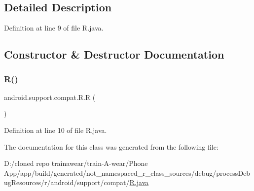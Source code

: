 \subsection{Detailed Description}


Definition at line 9 of file R.\+java.



\subsection{Constructor \& Destructor Documentation}
\mbox{\label{classandroid_1_1support_1_1compat_1_1_r_a5ccf4b4efeb034ade53739f6a3deee4d}} 
\subsubsection{\texorpdfstring{R()}{R()}}
{\footnotesize\ttfamily android.\+support.\+compat.\+R.\+R (\begin{DoxyParamCaption}{ }\end{DoxyParamCaption})\hspace{0.3cm}{\ttfamily [private]}}



Definition at line 10 of file R.\+java.


\begin{DoxyCode}{0}

\end{DoxyCode}


The documentation for this class was generated from the following file\+:\begin{DoxyCompactItemize}
\item 
D\+:/cloned repo trainawear/train-\/\+A-\/wear/\+Phone App/app/build/generated/not\+\_\+namespaced\+\_\+r\+\_\+class\+\_\+sources/debug/process\+Debug\+Resources/r/android/support/compat/\mbox{\hyperlink{process_debug_resources_2r_2android_2support_2compat_2_r_8java}{R.\+java}}\end{DoxyCompactItemize}
